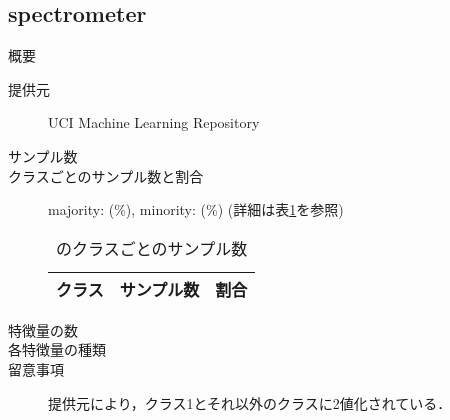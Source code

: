 \subsection{spectrometer}
\begin{description}
    \item[概要] \cite{}
    \item[提供元] UCI Machine Learning Repository
    \item[サンプル数] 
    \item[クラスごとのサンプル数と割合] majority:  (\%), minority:  (\%) (詳細は表\ref{tab:}を参照)

        \begin{table}[htbp]
            \centering
            \caption{のクラスごとのサンプル数}
            \label{tab:}
            \begin{tabular}{lrc} \hline
                \multicolumn{1}{c}{クラス}&
                \multicolumn{1}{c}{サンプル数}&
                \multicolumn{1}{c}{割合}\\
                \hline
                \hline

                \hline
            \end{tabular}
        \end{table}

    \item[特徴量の数] 
    \item[各特徴量の種類] \mbox{}
        
    \item[留意事項] 提供元により，クラス1とそれ以外のクラスに2値化されている．
\end{description}

